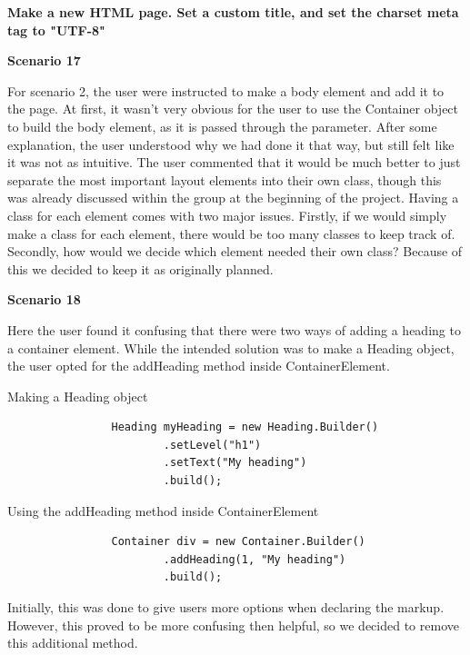 \documentclass[12pt]{article}
\begin{document}
        \textbf{Make a new HTML page. Set a custom title, and set the charset meta tag to "UTF-8"}

        \textbf{Scenario 17}

        For scenario 2, the user were instructed to make a body element and add it to the page. At first, it wasn't very obvious for the user to use the Container object to build the body element, as it is passed through the parameter. After some explanation, the user understood why we had done it that way, but still felt like it was not as intuitive. The user commented that it would be much better to just separate the most important layout elements into their own class, though this was already discussed within the group at the beginning of the project. Having a class for each element comes with two major issues. Firstly, if we would simply make a class for each element, there would be too many classes to keep track of. Secondly, how would we decide which element needed their own class? Because of this we decided to keep it as originally planned.

        \textbf{Scenario 18}

        Here the user found it confusing that there were two ways of adding a heading to a container element. While the intended solution was to make a Heading object, the user opted for the addHeading method inside ContainerElement.

        \begin{shaded}
            Making a Heading object

            \begin{lstlisting}
                Heading myHeading = new Heading.Builder()
                        .setLevel("h1")
                        .setText("My heading")
                        .build();
            \end{lstlisting}

            Using the addHeading method inside ContainerElement

            \begin{lstlisting}
                Container div = new Container.Builder()
                        .addHeading(1, "My heading")
                        .build();
            \end{lstlisting}
        \end{shaded}

        Initially, this was done to give users more options when declaring the markup. However, this proved to be more confusing then helpful, so we decided to remove this additional method.
\end{document}
